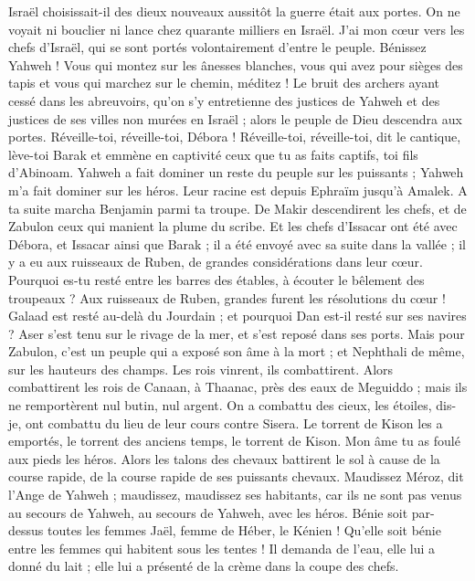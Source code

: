 \begin{multicols}{2}
Israël choisissait-il des dieux nouveaux aussitôt la guerre était aux portes. On ne voyait ni bouclier ni lance chez quarante milliers en Israël.
J'ai mon cœur vers les chefs d'Israël, qui se sont portés volontairement d'entre le peuple. Bénissez Yahweh !
Vous qui montez sur les ânesses blanches, vous qui avez pour sièges des tapis et vous qui marchez sur le chemin, méditez !
Le bruit des archers ayant cessé dans les abreuvoirs, qu'on s'y entretienne des justices de Yahweh et des justices de ses villes non murées en Israël ; alors le peuple de Dieu descendra aux portes.
Réveille-toi, réveille-toi, Débora ! Réveille-toi, réveille-toi, dit le cantique, lève-toi Barak et emmène en captivité ceux que tu as faits captifs, toi fils d'Abinoam.
Yahweh a fait dominer un reste du peuple sur les puissants ; Yahweh m'a fait dominer sur les héros.
Leur racine est depuis Ephraïm jusqu'à Amalek. A ta suite marcha Benjamin parmi ta troupe. De Makir descendirent les chefs, et de Zabulon ceux qui manient la plume du scribe.
Et les chefs d'Issacar ont été avec Débora, et Issacar ainsi que Barak ; il a été envoyé avec sa suite dans la vallée ; il y a eu aux ruisseaux de Ruben, de grandes considérations dans leur cœur.
Pourquoi es-tu resté entre les barres des étables, à écouter le bêlement des troupeaux ? Aux ruisseaux de Ruben, grandes furent les résolutions du cœur !
Galaad est resté au-delà du Jourdain ; et pourquoi Dan est-il resté sur ses navires ? Aser s'est tenu sur le rivage de la mer, et s'est reposé dans ses ports.
Mais pour Zabulon, c'est un peuple qui a exposé son âme à la mort ; et Nephthali de même, sur les hauteurs des champs.
Les rois vinrent, ils combattirent. Alors combattirent les rois de Canaan, à Thaanac, près des eaux de Meguiddo ; mais ils ne remportèrent nul butin, nul argent.
On a combattu des cieux, les étoiles, dis-je, ont combattu du lieu de leur cours contre Sisera.
Le torrent de Kison les a emportés, le torrent des anciens temps, le torrent de Kison. Mon âme tu as foulé aux pieds les héros.
Alors les talons des chevaux battirent le sol à cause de la course rapide, de la course rapide de ses puissants chevaux.
Maudissez Méroz, dit l'Ange de Yahweh ; maudissez, maudissez ses habitants, car ils ne sont pas venus au secours de Yahweh, au secours de Yahweh, avec les héros.
Bénie soit par-dessus toutes les femmes Jaël, femme de Héber, le Kénien ! Qu'elle soit bénie entre les femmes qui habitent sous les tentes !
Il demanda de l'eau, elle lui a donné du lait ; elle lui a présenté de la crème dans la coupe des chefs.

\end{multicols}
